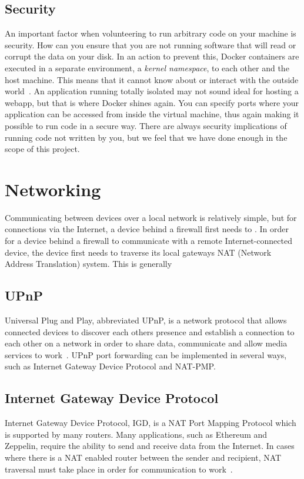 \subsection{Security}
An important factor when volunteering to run arbitrary code on your machine is security. 
How can you ensure that you are not running software that will read or corrupt the data on your disk. 
In an action to prevent this, Docker containers are executed in a separate environment, a \emph{kernel namespace}, to each other and the host machine. This means that it cannot know about or interact with the outside world~\cite{docker-security}. An application running totally isolated may not sound ideal for hosting a webapp, but that is where Docker shines again. You can specify ports where your application can be accessed from inside the virtual machine, thus again making it possible to run code in a secure way.
There are always security implications of running code not written by you, but we feel that we have done enough in the scope of this project.

\section{Networking}
Communicating between devices over a local network is relatively simple, but for connections via the Internet, a device behind a firewall first needs to . In order for a device behind a firewall to communicate with a remote Internet-connected device, the device first needs to traverse its local gateways NAT (Network Address Translation) system. This is generally 

\subsection{UPnP}
Universal Plug and Play, abbreviated UPnP, is a network protocol that allows connected devices to discover each others presence and establish a connection to each other on a network in order to share data, communicate and allow media services to work~\cite{upnp}. UPnP port forwarding can be implemented in several ways, such as Internet Gateway Device Protocol and NAT-PMP. 

\subsection{Internet Gateway Device Protocol}
Internet Gateway Device Protocol, IGD, is a NAT Port Mapping Protocol which is supported by many routers. Many applications, such as Ethereum and Zeppelin, require the ability to send and receive data from the Internet. In cases where there is a NAT enabled router between the sender and recipient, NAT traversal must take place in order for communication to work~\cite{igd:main}.

